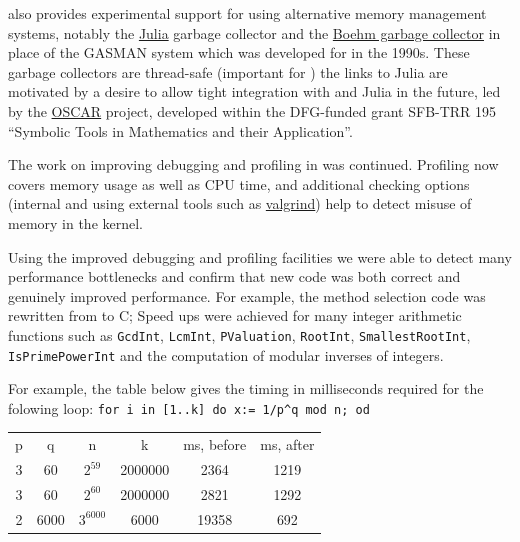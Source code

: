 \documentclass{deliverablereport}
\begin{document}
 also provides experimental support for using alternative
memory management systems, notably the \href{??}{Julia} garbage
collector and the \href{???}{Boehm garbage collector} in place of
the GASMAN system which was developed for  in the 1990s.
These garbage collectors are thread-safe (important for \HPCGAP) the
links to Julia are
motivated by a desire to allow tight integration with \GAP and Julia 
in the future, led by the \href{https://oscar.computeralgebra.de/}{OSCAR}
project, developed within the DFG-funded grant SFB-TRR 195
``Symbolic Tools in Mathematics and their Application''.

The work on improving debugging and profiling in \GAP was
continued. Profiling now covers memory usage as well as CPU time, and
additional checking options (internal and using external tools such as
\href{???}{valgrind}) help to detect misuse of memory in the kernel.

Using the improved debugging and profiling facilities we were able to detect many
performance bottlenecks and confirm that new code was both correct and
genuinely improved performance.
For example, the method selection code was rewritten from \GAP to C;
Speed ups were achieved for many integer arithmetic functions such as
\verb|GcdInt|, \verb|LcmInt|, \verb|PValuation|, 
\verb|RootInt|, \verb|SmallestRootInt|, \verb|IsPrimePowerInt|
and the computation of modular inverses of integers.

For example, the table below gives the timing in milliseconds required
for the folowing loop: \verb|for i in [1..k] do x:= 1/p^q mod n; od|

\begin{center}
\begin{tabular}{| c | c | c | c | c | c |} 
\hline
p & q    & n          & k        & ms, before & ms, after \\
3 & 60   & $2^{59}$   & 2000000  & 2364       & 1219 \\
3 & 60   & $2^{60}$   & 2000000  & 2821       & 1292 \\
2 & 6000 & $3^{6000}$ & 6000     & 19358      & 692  \\
\hline
\end{tabular}
\end{center}

%
%
\end{document}
